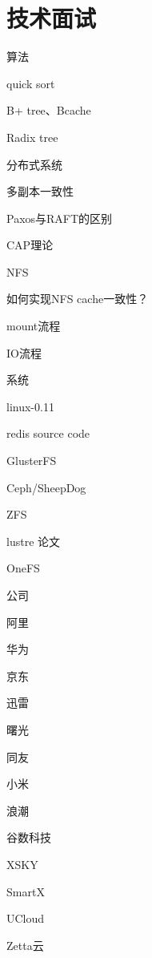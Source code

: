 \section{技术面试}

算法
\begin{enumbox}
\item quick sort
\item B+ tree、Bcache
\item Radix tree
\end{enumbox}

分布式系统
\begin{enumbox}
\item 多副本一致性
\item Paxos与RAFT的区别
\item CAP理论
\end{enumbox}

NFS
\begin{enumbox}
\item 如何实现NFS cache一致性？
\item mount流程
\item IO流程
\end{enumbox}

系统
\begin{enumbox}
\item linux-0.11
\item redis source code
\item GlusterFS
\item Ceph/SheepDog
\item ZFS
\item lustre 论文
\item OneFS
\end{enumbox}

公司
\begin{enumbox}
\item 阿里
\item 华为
\item 京东
\item 迅雷
\item 曙光
\item 同友
\item 小米
\item 浪潮
\item 谷数科技
\item XSKY
\item SmartX
\item UCloud
\item Zetta云
\end{enumbox}
